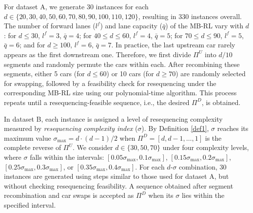 \documentclass[12pt]{article}
\begin{document}
For dataset A, we generate 30 instances for each $d\in \{20, 30, 40, 50, 60, 70, 80, 90, 100, 110, 120\}$, resulting in 330 instances overall. The number of forward lanes ($l^f$) and lane capacity ($\bar{q}$) of the MB-RL vary with $d$: %
for $d\leqslant30$, $l^f=3$, $\bar{q}=4$; for $40\leqslant d\leqslant 60$, $l^f=4$, $\bar{q}=5$; for $70\leqslant d\leqslant 90$, $l^f=5$, $\bar{q}=6$; and for $d\geqslant 100$, $l^f=6$, $\bar{q}=7$. In practice, the last upstream car rarely appears as the first downstream one. Therefore, we first divide $\Pi^{U}$ into $d/10$ segments and randomly permute the cars within each. After recombining these segments, either 5 cars (for $d\leqslant 60$) or 10 cars (for $d\geqslant 70$) are randomly selected for swapping, followed by a feasibility check for resequencing under the corresponding MB-RL size using our polynomial-time algorithm. This process repeats until a resequencing-feasible sequence, i.e., the desired $\Pi^{D}$, is obtained.


In dataset B, each instance is assigned a level of resequencing complexity measured by \textit{resequencing complexity index} ($\sigma$). By Definition \ref{def1}, $\sigma$ reaches its maximum value $\sigma_{\text{max}}=d\cdot (d-1)/2$ when $\Pi^{D}=[d,d-1,\dots,1]$ is the complete reverse of $\Pi^{U}$. We consider $d\in \{30,50,70\}$ under four complexity levels, where $\sigma$ falls within the intervals: $[0.05\sigma_{\text{max}}, 0.1\sigma_{\text{max}}]$, $[0.15 \sigma_{\text{max}}, 0.2 \sigma_{\text{max}}]$, $[0.25 \sigma_{\text{max}}, 0.3\sigma_{\text{max}}]$, or $[0.35 \sigma_{\text{max}}, 0.4\sigma_{\text{max}}]$. For each $d$-$\sigma$ combination, 30 instances are generated using steps similar to those used for dataset A, but without checking resequencing feasibility. A sequence obtained after segment recombination and car swaps is accepted as $\Pi^{D}$ when its $\sigma$ lies within the specified interval.
\end{document}
